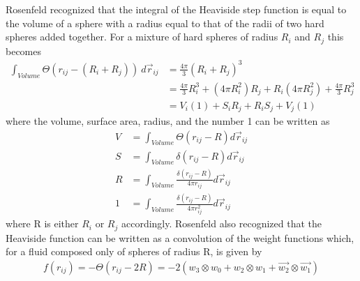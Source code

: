 \documentclass[double,12pt]{beavtex}
\begin{document}
%
Rosenfeld recognized that the integral of the Heaviside step function
is equal to the volume of a sphere with a radius equal to that of the radii 
of two hard spheres added together. For a mixture of hard spheres of radius $R_i$ and $R_j$
this becomes
\begin{align}
       \int_{Volume} \Theta(r_{ij}-(R_i+R_j))~d\vec r_{ij} &=\frac{4\pi}{3}(R_i+R_j)^3  \label{exclusion-volume}\\
       &= \frac{4\pi}{3}R_i^3 + (4\pi R_i^2)R_j + R_i(4\pi R_j^2) + \frac{4\pi}{3}R_j^3  \nonumber \\
       &= V_i(1) + S_iR_j + R_iS_j+ V_j(1)  \label{VSR1sum}
\end{align}  
where the volume, surface area, radius, and the number 1 can be written as
\begin{align}
        V &= \int_{Volume} \Theta(r_{ij}-R)d\vec r_{ij} \\
        S &= \int_{Volume} \delta(r_{ij} -R) d\vec r_{ij}  \\
        R &= \int_{Volume} \frac{\delta(r_{ij} -R)}{4\pi r_{ij}} d\vec r_{ij} \\
        1 &= \int_{Volume} \frac{\delta(r_{ij} -R)}{4\pi r_{ij}^2} d\vec r_{ij}    
\end{align}
where R is either $R_i$ or $R_j$ accordingly. Rosenfeld also recognized that the 
Heaviside function can be written as a convolution of the weight functions 
which, for a fluid composed only of spheres of radius R, is given by
\begin{align} \label{mayerconvolution}
    f(r_{ij})=-\Theta(r_{ij}-2R)= -2(w_3 \otimes w_0 + w_2 \otimes w_1 + \vec{w_2} \otimes \vec{w_1})
\end{align} 
\end{document}
